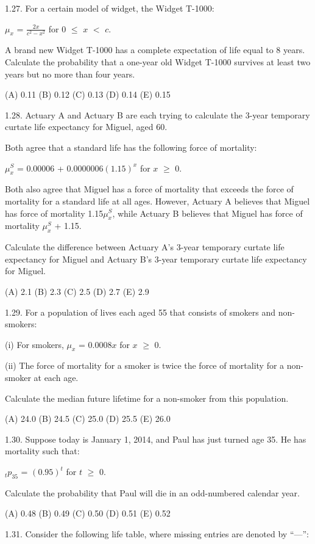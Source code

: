 \documentclass[]{book}
\begin{document}
1.27. For a certain model of widget, the Widget T-1000:

\(\mu_x\) = \(\frac{2x}{c^2 - x^2}\) for 0 \(\le\) \(x\) \(<\) \(c\).

A brand new Widget T-1000 has a complete expectation of life equal to 8
years. Calculate the probability that a one-year old Widget T-1000
survives at least two years but no more than four years.

(A) 0.11 (B) 0.12 (C) 0.13 (D) 0.14 (E) 0.15

1.28. Actuary A and Actuary B are each trying to calculate the 3-year
temporary curtate life expectancy for Miguel, aged 60.

Both agree that a standard life has the following force of mortality:

\(\mu^S_x\) = 0.00006 + 0.0000006\((1.15)^{x}\) for \(x\) \(\ge\) 0.

Both also agree that Miguel has a force of mortality that exceeds the
force of mortality for a standard life at all ages. However, Actuary A
believes that Miguel has force of mortality 1.15\(\mu^S_x\), while
Actuary B believes that Miguel has force of mortality \(\mu^S_x\) +
1.15.

Calculate the difference between Actuary A's 3-year temporary curtate
life expectancy for Miguel and Actuary B's 3-year temporary curtate life
expectancy for Miguel.

(A) 2.1 (B) 2.3 (C) 2.5 (D) 2.7 (E) 2.9

1.29. For a population of lives each aged 55 that consists of smokers
and non-smokers:

(i) For smokers, \(\mu_x\) = 0.0008\(x\) for \(x\) \(\ge\) 0.

(ii) The force of mortality for a smoker is twice the force of mortality
for a non-smoker at each age.

Calculate the median future lifetime for a non-smoker from this
population.

(A) 24.0 (B) 24.5 (C) 25.0 (D) 25.5 (E) 26.0

1.30. Suppose today is January 1, 2014, and Paul has just turned age 35.
He has mortality such that:

\({}_{t}p_{35}\) = \((0.95)^t\) for \(t\) \(\ge\) 0.

Calculate the probability that Paul will die in an odd-numbered calendar
year.

(A) 0.48 (B) 0.49 (C) 0.50 (D) 0.51 (E) 0.52

1.31. Consider the following life table, where missing entries are
denoted by ``---'':
\end{document}
